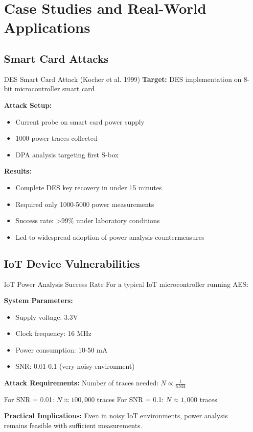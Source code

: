 \documentclass[11pt,a4paper]{article}
\theoremstyle{definition}
\begin{document}
\section{Case Studies and Real-World Applications}

\subsection{Smart Card Attacks}

\begin{examplebox}{DES Smart Card Attack (Kocher et al. 1999)}
\textbf{Target:} DES implementation on 8-bit microcontroller smart card

\textbf{Attack Setup:}
\begin{itemize}
    \item Current probe on smart card power supply
    \item 1000 power traces collected
    \item DPA analysis targeting first S-box
\end{itemize}

\textbf{Results:}
\begin{itemize}
    \item Complete DES key recovery in under 15 minutes
    \item Required only 1000-5000 power measurements  
    \item Success rate: >99\% under laboratory conditions
    \item Led to widespread adoption of power analysis countermeasures
\end{itemize}
\end{examplebox}

\subsection{IoT Device Vulnerabilities}

\begin{mathematicsbox}{IoT Power Analysis Success Rate}
For a typical IoT microcontroller running AES:

\textbf{System Parameters:}
\begin{itemize}
    \item Supply voltage: 3.3V
    \item Clock frequency: 16 MHz  
    \item Power consumption: 10-50 mA
    \item SNR: 0.01-0.1 (very noisy environment)
\end{itemize}

\textbf{Attack Requirements:}
Number of traces needed: $N \propto \frac{1}{\text{SNR}}$

For SNR = 0.01: $N \approx 100,000$ traces
For SNR = 0.1: $N \approx 1,000$ traces

\textbf{Practical Implications:}
Even in noisy IoT environments, power analysis remains feasible with sufficient measurements.
\end{mathematicsbox}
\end{document}
